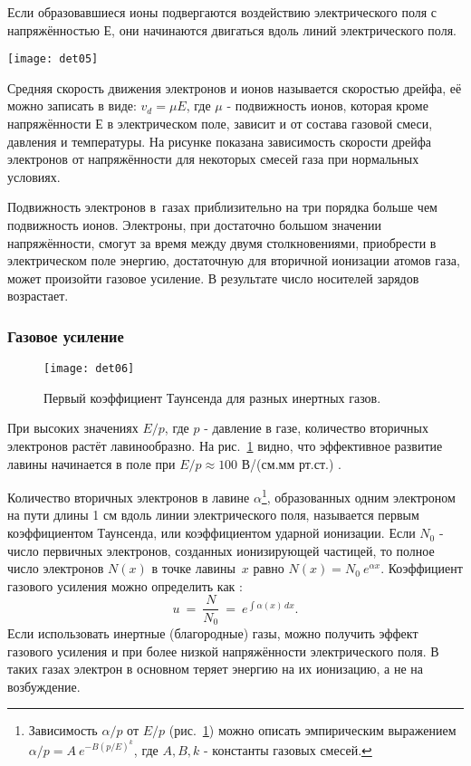 Если образовавшиеся ионы подвергаются воздействию электрического поля
с напряжённостью $Е$, они начинаются двигаться вдоль линий электрического
поля.
\begin{floatingfigure}[l]{7.0cm}
  \hspace{-0.7cm}
  \texttt{[image: det05]}
\end{floatingfigure}
\noindent
Средняя скорость движения электронов и ионов называется скоростью дрейфа,
её можно записать в виде: $v_d =\mu E$, где $\mu$ - подвижность ионов,
которая кроме напряжённости $Е$ в электрическом поле, зависит и от состава
газовой смеси, давления и температуры. На рисунке показана зависимость
скорости дрейфа электронов от напряжённости для некоторых смесей газа при
нормальных условиях.

Подвижность электронов в~газах приблизительно на три порядка больше чем
подвижность ионов.
Электроны, при достаточно большом значении напряжённости, смогут за
время между двумя столкновениями, приобрести в электрическом поле
энергию, достаточную для вторичной ионизации атомов газа, может произойти
газовое усиление. В результате число носителей зарядов возрастает.

\subsubsection{Газовое усиление}
\begin{figure}[]\center
  \texttt{[image: det06]}
  \caption{Первый коэффициент Таунсенда для разных инертных газов.}
  \label{fig:det06}
\end{figure}

При высоких значениях $E/p$, где $p$ - давление в газе, количество
вторичных электронов растёт лавинообразно. На рис.~\ref{fig:det06} видно,
что эффективное развитие лавины начинается в поле при $E/p \approx 100$
В/(см.мм рт.ст.) \cite{rop:04}.

Количество вторичных электронов в лавине $\alpha$\footnote{Зависимость
  $\alpha/p$ от $E/p$ (рис.~\ref{fig:det06}) можно описать эмпирическим
  выражением $\alpha/p = A~e^{-B(p/E)^k}$, где $A, B, k$ - константы газовых
  смесей.}, образованных одним электроном
на пути длины 1 см вдоль линии электрического поля,
называется первым коэффициентом Таунсенда, или коэффициентом ударной
ионизации. Если $N_0$ - число первичных электронов, созданных
ионизирующей
частицей, то полное число электронов $N(x)$ %
в точке лавины~$x$ равно $N(x) = N_0~e^{\alpha x}$. Коэффициент газового
усиления можно определить как \cite{sau:02}:
\[
 u~=~\frac{N}{N_0}~=~e^ {\int \alpha(x) \,dx}.
\]
Если использовать инертные (благородные) газы, можно получить эффект
газового усиления и при более низкой напряжённости электрического поля.
В таких газах электрон в основном теряет энергию на их ионизацию, а не на
возбуждение.

